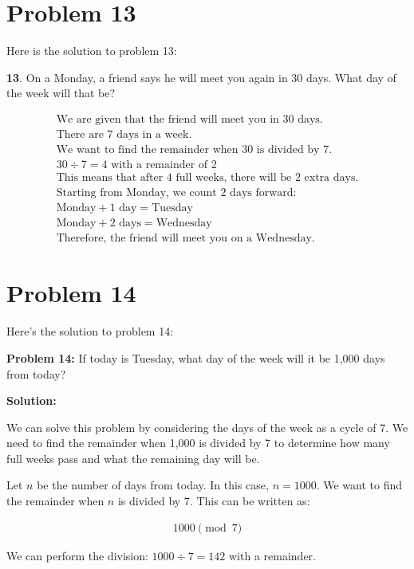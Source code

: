 \documentclass{article}
\begin{document}
\newpage

\section*{\textbf{Problem 13}}
Here is the solution to problem 13:

\textbf{13}. On a Monday, a friend says he will meet you again in 30 days. What day of the week will that be?

\begin{align}
\text{We are given that the friend will meet you in 30 days.} \\
\text{There are 7 days in a week.} \\
\text{We want to find the remainder when 30 is divided by 7.} \\
30 \div 7 = 4 \text{ with a remainder of } 2 \\
\text{This means that after 4 full weeks, there will be 2 extra days.} \\
\text{Starting from Monday, we count 2 days forward:} \\
\text{Monday} + 1 \text{ day} = \text{Tuesday} \\
\text{Monday} + 2 \text{ days} = \text{Wednesday} \\
\text{Therefore, the friend will meet you on a Wednesday.}
\end{align}

\newpage

\section*{\textbf{Problem 14}}
Here's the solution to problem 14:

\textbf{Problem 14:} If today is Tuesday, what day of the week will it be 1,000 days from today?

\textbf{Solution:}

We can solve this problem by considering the days of the week as a cycle of 7. We need to find the remainder when 1,000 is divided by 7 to determine how many full weeks pass and what the remaining day will be.

Let $n$ be the number of days from today. In this case, $n = 1000$.
We want to find the remainder when $n$ is divided by 7. This can be written as:

\begin{align} 1000 \pmod{7} \end{align}

We can perform the division:
$1000 \div 7 = 142$ with a remainder.
\end{document}
